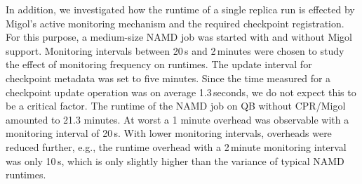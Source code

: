 \documentclass{rspublic}
\begin{document}
In addition, we investigated how the runtime of a single replica run
is effected by Migol's active monitoring mechanism and the required
checkpoint registration. For this purpose, a medium-size NAMD job was
started with and without Migol support.  Monitoring intervals between
20\,s and 2\,minutes were chosen to study the effect of monitoring
frequency on runtimes. The update interval for checkpoint metadata was
set to five minutes.  Since the time measured for a checkpoint update
operation was on average 1.3\,seconds, we do not expect this to be a
critical factor.  The runtime of the NAMD job on QB without CPR/Migol
amounted to 21.3 minutes.  At worst a 1 minute overhead was observable
with a monitoring interval of 20\,s. With lower monitoring intervals,
overheads were reduced further, e.g., the runtime overhead with a
2\,minute monitoring interval was only 10\,s, which is only slightly
higher than the variance of typical NAMD runtimes.
\end{document}
